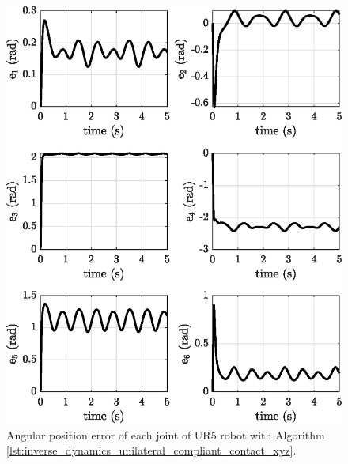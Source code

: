 	
\begin{figure}[H]
    \centering
    \includegraphics{images/act_2.7_xyz/e.eps}
    \caption{Angular position error of each joint of UR5 robot with Algorithm \ref{lst:inverse_dynamics_unilateral_compliant_contact_xyz}.}
    \label{fig:act_2.7_xyz_e}
\end{figure}

